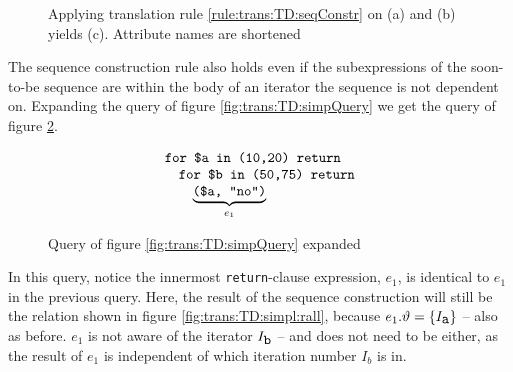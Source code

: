 \begin{myExample}
\begin{figure}[!h]
\caption[Example: constructing a sequence]{Applying translation rule \ref{rule:trans:TD:seqConstr} on (a) and (b)
yields (c). Attribute names are shortened \label{fig:trans:TD:simpleSeq}}
\end{figure}

The sequence construction rule also holds even if the subexpressions of the
soon-to-be sequence are within the body of an iterator the sequence is not
dependent on. Expanding the query of figure \ref{fig:trans:TD:simpQuery} we get
the query of figure \ref{fig:trans:TD:expandQuery}. 

\begin{figure}[h]
\begin{equation*}
\begin{array}{l}
\mbox{\texttt{for \$a in (10,20) return}} \\ \quad
\mbox{\texttt{for \$b in (50,75) return}} \\ \quad \quad
\underbrace{ \mbox{\texttt{(\$a, "no")}} }_{e_{1}}
\end{array}
\end{equation*}
\caption{Query of figure \ref{fig:trans:TD:simpQuery} expanded}
\label{fig:trans:TD:expandQuery}
\end{figure}

In this query, notice the innermost \texttt{return}-clause expression, $e_{1}$, is identical to $e_{1}$ in the
previous query. Here, the result of the sequence construction will still be the relation shown in figure
\ref{fig:trans:TD:simpl:rall}, because $e_{1}.\vartheta=\left\{I_{\mbox{\texttt{a}}}\right\}$ -- also as before.
$e_{1}$ is not aware of the iterator $I_{\mbox{\texttt{b}}}$ -- and does not need to be either, as the result of
$e_{1}$ is independent of which iteration number $I_{b}$ is in.

\end{myExample}
